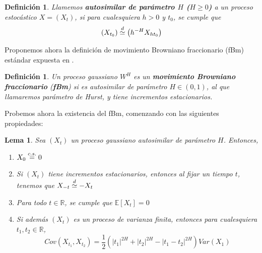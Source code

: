 \documentclass[letterpaper,12pt,oneside]{book}
\theoremstyle{plain}
\newtheorem{dfn}[theorem]{Definición}
\newtheorem{lem}[theorem]{Lema}
\numberwithin{theorem}{section}
\begin{document}
\begin{dfn}\label{Def1.2.1}
Llamemos \textbf{autosimilar de parámetro $H$ ($H\geq0$)} a un proceso estocástico $X=(X_t)$, si para cualesquiera $h>0$ y $t_0$, se cumple que
\begin{align*}
\left(X_{t_0}\right)\buildrel d\over\simeq \left(h^{-H}X_{ht_0}\right)
\end{align*}
\end{dfn}
Proponemos ahora la definición de movimiento Browniano fraccionario (fBm) estándar expuesta en \cite{samorodnitsky_stable_1994}.
\begin{dfn}
Un proceso gaussiano $W^H$ es un \textbf{movimiento Browniano fraccionario} (\textbf{fBm}) si es autosimilar de parámetro $H\in(0,1)$, al que llamaremos parámetro de Hurst, y tiene incrementos estacionarios.
\end{dfn}
Probemos ahora la existencia del fBm, comenzando con las siguientes propiedades:
\begin{lem}\label{lem1.1.3}
	Sea $(X_t)$ un proceso gaussiano autosimilar de parámetro $H$. Entonces,
	\begin{enumerate}
		\item\label{lem1.2.3.1} $X_0\buildrel c.s. \over =0$
		\item\label{lem1.2.3.2} Si $(X_t)$ tiene incrementos estacionarios, entonces al fijar un tiempo $t$, tenemos que $X_{-t}\buildrel d \over\simeq -X_t$
		\item\label{lem1.2.3.3} Para todo $t\in\mathbb R$, se cumple que $\mathbb E[X_t]=0$
		\item\label{lem1.2.3.4} Si además $(X_t)$ es un proceso de varianza finita, entonces para cualesquiera $t_1,t_2\in\mathbb R$,
		$$Cov(X_{t_1},X_{t_2})=\frac{1}{2}\left(|t_1|^{2H}+|t_2|^{2H}-|t_1-t_2|^{2H}\right)Var (X_1)$$
	\end{enumerate}
\end{lem}
\end{document}
